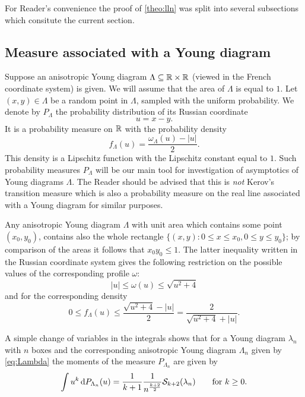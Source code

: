 \documentclass[12pt,usenames,dvipsnames,svgnames,table]{amsart}
\begin{document}
For Reader's convenience the proof of \cref{theo:lln} was split
into several subsections which consitute the current section.

\subsection{Measure associated with a Young diagram}
\label{subsec:MeasureAssociatedWithYoung}

Suppose an anisotropic Young diagram $\Lambda\subseteq \mathbb{R}\times \mathbb{R}$ 
(viewed in the French coordinate system) is given.
We will assume that the area of $\Lambda$ is equal to $1$. Let $(x,y)\in\Lambda$
be a random point in $\Lambda$, sampled with the uniform probability.
We denote by $P_{\Lambda}$ the probability distribution of its Russian coordinate
\[ u = x-y.\]
It is a probability measure on $\mathbb{R}$ with the probability density
\begin{equation}
\label{eq:density}
f_{\Lambda}(u)=\frac{\omega_\Lambda(u)-|u|}{2}.   
\end{equation}
This density is a Lipschitz function with the Lipschitz constant equal to $1$.
Such probability measures $P_{\Lambda}$ will be our main tool for investigation
of asymptotics of Young diagrams $\Lambda$. The Reader should be advised that
this is \emph{not} Kerov's transition measure
which is also a probability measure on the real line associated with
a Young diagram \cite{Kerov1993transition} for similar purposes. 

Any anisotropic Young diagram $\Lambda$ with unit area which contains some point $(x_0,y_0)$, contains also
the whole rectangle $\{ (x,y) : 0\leq x \leq x_0, 0\leq y\leq y_0 \}$; by comparison of the areas 
it follows that $x_0 y_0\leq 1$.
The latter inequality written in the Russian coordinate system gives the following restriction
on the possible values of the corresponding profile $\omega$:
\[ |u| \leq \omega(u) \leq \sqrt{u^2+4} \] 
and for the corresponding density 
\begin{equation}
\label{eq:bounds-on-density}
0\leq f_\Lambda(u) \leq \frac{\sqrt{u^2+4}-|u|}{2} = \frac{2}{\sqrt{u^2+4}+|u|}.    
\end{equation}

A simple change of variables in the integrals shows that
for a Young diagram $\lambda_n$ with $n$ boxes and the corresponding anisotropic Young diagram
$\Lambda_n$ given by \eqref{eq:Lambda} the moments of the measure $P_{\Lambda_n}$
are given by
\[ \int u^{k} \dif P_{\Lambda_n}(u) = \frac{1}{k+1} \frac{1}{n^{\frac{k+2}{2}}}   \Sfunct_{k+2}(\lambda_n)
\qquad \text{for $k\geq 0$.}
\]
\end{document}
